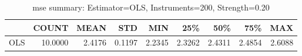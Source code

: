 \begin{table}[ht]
\centering
\caption{mse summary: Estimator=OLS, Instruments=200, Strength=0.20}
\begin{tabular}{lrrrrrrrr}
\toprule
 & COUNT & MEAN & STD & MIN & 25\% & 50\% & 75\% & MAX \\
\midrule
OLS & 10.0000 & 2.4176 & 0.1197 & 2.2345 & 2.3262 & 2.4311 & 2.4854 & 2.6088 \\
\bottomrule
\end{tabular}
\end{table}
